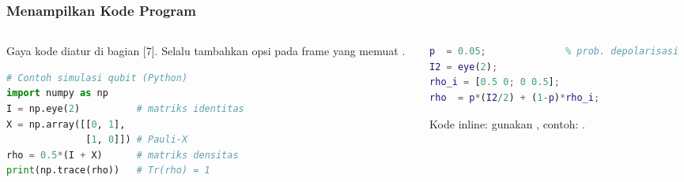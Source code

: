 \begin{frame}[fragile]   %
    \frametitle{Menampilkan Kode Program}
    \begin{columns}[T]
        \begin{column}{0.48\textwidth}
            {\tiny Gaya kode diatur di  bagian [7].
                   Selalu tambahkan opsi \code{[fragile]} pada frame
                   yang memuat .}
            \begin{lstlisting}[language=Python,basicstyle=\ttfamily\scriptsize]
# Contoh simulasi qubit (Python)
import numpy as np
I = np.eye(2)          # matriks identitas
X = np.array([[0, 1],
              [1, 0]]) # Pauli-X
rho = 0.5*(I + X)      # matriks densitas
print(np.trace(rho))   # Tr(rho) = 1
            \end{lstlisting}
        \end{column}
        \begin{column}{0.48\textwidth}
            \begin{lstlisting}[language=Matlab,basicstyle=\ttfamily\scriptsize]
% Contoh kanal depolarizing (MATLAB)
p  = 0.05;              % prob. depolarisasi
I2 = eye(2);
rho_i = [0.5 0; 0 0.5];
rho  = p*(I2/2) + (1-p)*rho_i;
            \end{lstlisting}
            {\tiny Kode inline: gunakan ,
                   contoh: .}
        \end{column}
    \end{columns}
\end{frame}

